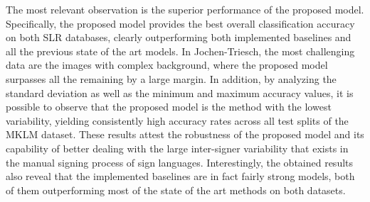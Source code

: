 \begin{table}[t]
    \centering
    \caption{Classification accuracy (\%) of the proposed adversarial method and baselines on Jochen-Triesch and MKLM datasets.}
    \label{tab:adv_signer_inv_results}
\end{table}

The most relevant observation is the superior performance of the proposed model. Specifically, the proposed model provides the best overall classification accuracy on both SLR databases, clearly outperforming both implemented baselines and all the previous state of the art models. In Jochen-Triesch, the most challenging data are the images with complex background, where the proposed model surpasses all the remaining by a large margin. In addition, by analyzing the standard deviation as well as the minimum and maximum accuracy values, it is possible to observe that the proposed model is the method with the lowest variability, yielding consistently high accuracy rates across all test splits of the MKLM dataset. These results attest the robustness of the proposed model and its capability of better dealing with the large inter-signer variability that exists in the manual signing process of sign languages. Interestingly, the obtained results also reveal that the implemented baselines are in fact fairly strong models, both of them outperforming most of the state of the art methods on both datasets.

